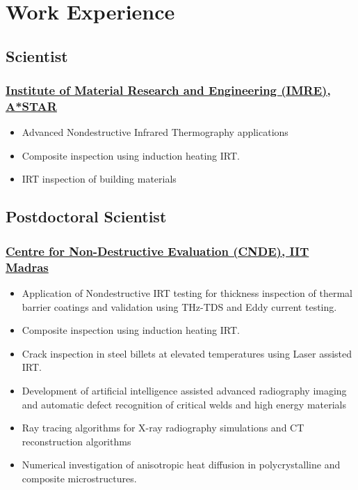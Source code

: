 \documentclass{my_cv}%
\begin{document}
\section{Work Experience}
\vspace{1.0em}
\subsection{Scientist}
\subsubsection{\href{https://www.a-star.edu.sg/imre}{Institute of Material Research and Engineering (IMRE), A*STAR}}
\begin{itemize}[leftmargin=0.15in]
\setlength\itemsep{-0.1em}
\color{mygray}
\item Advanced Nondestructive Infrared Thermography applications
\item Composite inspection using induction heating IRT.
\item IRT inspection of building materials
\end{itemize}%
{\color{mygray1} \hdashrule[0.1ex]{18.8cm}{0.2mm}{1mm}}
\subsection{Postdoctoral Scientist}
\subsubsection{\href{https://www.cnde.in/}{Centre for Non-Destructive Evaluation (CNDE), IIT Madras}}
\begin{itemize}[leftmargin=0.15in]
\setlength\itemsep{-0.1em}
\color{mygray}
\item Application of Nondestructive IRT testing for thickness inspection of thermal barrier coatings and validation using THz-TDS and Eddy current testing.
\item Composite inspection using induction heating IRT.
\item Crack inspection in steel billets at elevated temperatures using Laser assisted IRT.
\item Development of artificial intelligence assisted advanced radiography imaging and automatic defect recognition of critical welds and high energy materials
\item Ray tracing algorithms for X-ray radiography simulations and CT reconstruction algorithms
\item Numerical investigation of anisotropic heat diffusion in polycrystalline and composite microstructures.
\end{itemize}%
{\color{mygray1} \hdashrule[0.1ex]{18.8cm}{0.2mm}{1mm}}
\end{document}
